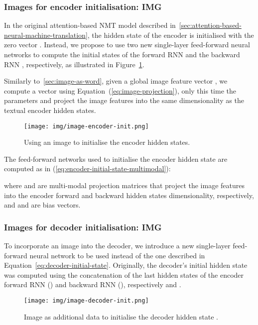 \documentclass[11pt,twocolumn]{article}
\begin{document}
\subsubsection{Images for encoder initialisation: \texorpdfstring{IMG}{}}
\label{sec:image-encoder-init}

In the original attention-based NMT model described in~\cref{sec:attention-based-neural-machine-translation}, the hidden state of the encoder is initialised with the zero vector .
Instead, we propose to use two new single-layer feed-forward neural networks to compute the initial states of the forward RNN  and the backward RNN , respectively, as illustrated in Figure~\ref{fig:image-encoder-init}.

Similarly to~\cref{sec:image-as-word}, given a global image feature vector , we compute a vector  using Equation~(\ref{eq:image-projection}), only this time the parameters  and  project the image features into the same dimensionality as the textual encoder hidden states.

\begin{figure}[t!]
 \centering
 \texttt{[image: img/image-encoder-init.png]}
 \caption{Using an image to initialise the encoder hidden states.}
 \label{fig:image-encoder-init}
\end{figure}

The feed-forward networks used to initialise the encoder hidden state are computed as in (\ref{eq:encoder-initial-state-multimodal}):

\noindent
where  and  are multi-modal projection matrices that project the image features  into the encoder forward and backward hidden states dimensionality, respectively, and  and  are bias vectors.



\subsubsection{Images for decoder initialisation: \texorpdfstring{IMG}{}}
\label{sec:image-decoder-init}

To incorporate an image into the decoder, we introduce a new single-layer feed-forward neural network to be used instead of the one described in Equation~\ref{eq:decoder-initial-state}.
Originally, the decoder's initial hidden state was computed using the concatenation of the last hidden states of the encoder forward RNN  () and backward RNN (), respectively  and .

\begin{figure}[t!]
 \centering
 \texttt{[image: img/image-decoder-init.png]}
 \caption{Image as additional data to initialise the decoder
 hidden state .}
 \label{fig:image-decoder-init}
\end{figure}
\end{document}
